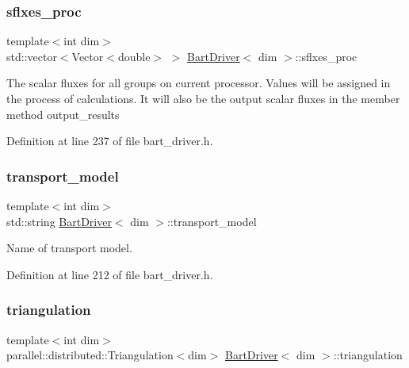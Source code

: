 \subsubsection{\texorpdfstring{sflxes\+\_\+proc}{sflxes\_proc}}
{\footnotesize\ttfamily template$<$int dim$>$ \\
std\+::vector$<$Vector$<$double$>$ $>$ \hyperlink{class_bart_driver}{Bart\+Driver}$<$ dim $>$\+::sflxes\+\_\+proc\hspace{0.3cm}{\ttfamily [private]}}

The scalar fluxes for all groups on current processor. Values will be assigned in the process of calculations. It will also be the output scalar fluxes in the member method output\+\_\+results 

Definition at line 237 of file bart\+\_\+driver.\+h.

\mbox{\label{class_bart_driver_a736f40f99459dc715fdb174e06626f55}} 
\subsubsection{\texorpdfstring{transport\+\_\+model}{transport\_model}}
{\footnotesize\ttfamily template$<$int dim$>$ \\
std\+::string \hyperlink{class_bart_driver}{Bart\+Driver}$<$ dim $>$\+::transport\+\_\+model\hspace{0.3cm}{\ttfamily [private]}}



Name of transport model. 



Definition at line 212 of file bart\+\_\+driver.\+h.

\mbox{\label{class_bart_driver_a8bdcafa21b042017d1e871ed07ae3a81}} 
\subsubsection{\texorpdfstring{triangulation}{triangulation}}
{\footnotesize\ttfamily template$<$int dim$>$ \\
parallel\+::distributed\+::\+Triangulation$<$dim$>$ \hyperlink{class_bart_driver}{Bart\+Driver}$<$ dim $>$\+::triangulation\hspace{0.3cm}{\ttfamily [private]}}



